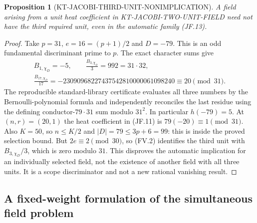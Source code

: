 \documentclass[11pt,a4paper]{article}
\newtheorem{proposition}[theorem]{Proposition}
\theoremstyle{definition}
\begin{document}


\begin{proposition}[KT-JACOBI-THIRD-UNIT-NONIMPLICATION]
A field arising from a unit heat coefficient in
KT-JACOBI-TWO-UNIT-FIELD need not have the third required unit,
even in the automatic family (JF.13).
\end{proposition}
\begin{proof}
Take $p=31$, $e=16=(p+1)/2$ and $D=-79$.  This is an odd
fundamental discriminant prime to $p$.  The exact character sums give
\[
\begin{gathered}
 B_{1,\chi_D}=-5,\qquad
 \frac{B_{3,\chi_D}}3=992=31\cdot32,\\
 \frac{B_{17,\chi_D}}{17}
       =-23090968227437542810000061098240
       \equiv20\pmod{31}.
\end{gathered}
\]
The reproducible standard-library certificate
 evaluates all three
numbers by the Bernoulli-polynomial formula and independently
reconciles the last residue using the defining conductor-$79\cdot31$
sum modulo $31^2$.  In particular $h(-79)=5$.
At $(n,r)=(20,1)$ the heat coefficient in (JF.11) is
$79(-20)\equiv1\pmod{31}$.  Also $K=50$, so $n\leq K/2$
and $|D|=79\leq3p+6=99$: this is inside the proved selection bound.
But $2e\equiv2\pmod{30}$, so (FV.2) identifies the third unit
with $B_{3,\chi_D}/3$, which is zero modulo $31$.
This disproves the automatic implication for an individually selected
field, not the existence of another field with all three units.
It is a scope discriminator and not a new rational vanishing result.
\end{proof}



\subsection{A fixed-weight formulation of the simultaneous field problem}
\end{document}
